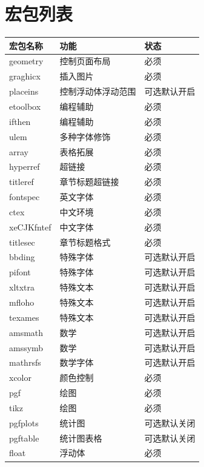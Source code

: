 \documentclass[twoside,maketable]{cauthesis}
\begin{document}
    \section{宏包列表}
    \begin{center}
        \begin{supertabular}{lll}
            \hline
            宏包名称&功能&状态\\
            \hline
            geometry&控制页面布局&必须\\
            graghicx&插入图片&必须\\
            placeins&控制浮动体浮动范围&可选默认开启\\
            etoolbox&编程辅助&必须\\
            ifthen&编程辅助&必须\\
            ulem&多种字体修饰&必须\\
            array&表格拓展&必须\\
            \hline
            hyperref&超链接&必须\\
            titleref&章节标题超链接&必须\\
            fontspec&英文字体&必须\\
            ctex&中文环境&必须\\
            xeCJKfntef&中文字体&必须\\
            titlesec&章节标题格式&必须\\
            \hline
            bbding&特殊字体&可选默认开启\\
            pifont&特殊字体&可选默认开启\\
            xltxtra&特殊文本&可选默认开启\\
            mfloho&特殊文本&可选默认开启\\
            texames&特殊文本&可选默认开启\\
            \hline
            amsmath&数学&可选默认开启\\
            amssymb&数学&可选默认开启\\
            mathrsfs&数学字体&可选默认开启\\
            \hline
            xcolor&颜色控制&必须\\
            pgf&绘图&必须\\
            tikz&绘图&必须\\
            pgfplots&统计图&可选默认关闭\\
            pgftable&统计图表格&可选默认关闭\\
            \hline
            float&浮动体&必须\\

\end{supertabular}
\end{center}
\end{document}

